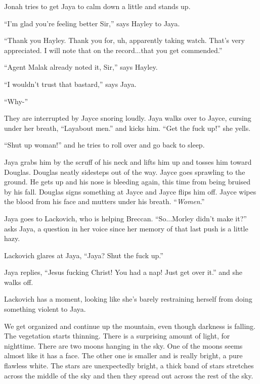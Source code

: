 Jonah tries to get Jaya to calm down a little and stands up.

``I'm glad you're feeling better Sir,'' says Hayley to Jaya.

``Thank you Hayley. Thank you for, uh, apparently taking watch.  That's very appreciated.  I will note that on the record...that you get commended.''

``Agent Malak already noted it, Sir,'' says Hayley.

``I wouldn't trust that bastard,'' says Jaya.

``Why-''

They are interrupted by Jayce snoring loudly.  Jaya walks over to Jayce, cursing under her breath, ``Layabout men.'' and kicks him.  ``Get the fuck up!'' she yells.

``Shut up woman!'' and he tries to roll over and go back to sleep.

Jaya grabs him by the scruff of his neck and lifts him up and tosses him toward Douglas.  Douglas neatly sidesteps out of the way.  Jayce goes sprawling to the ground.  He gets up and his nose is bleeding again, this time from being bruised by his fall.  Douglas signs something at Jayce and Jayce flips him off.  Jayce wipes the blood from his face and mutters under his breath.  ``\textit{Women}.''



Jaya goes to Lackovich, who is helping Breccan.  ``So...Morley didn't make it?'' asks Jaya, a question in her voice since her memory of that last push is a little hazy.

Lackovich glares at Jaya, ``Jaya?  Shut the fuck up.''

Jaya replies, ``Jesus fucking Christ!  You had a nap!  Just get over it.'' and she walks off.

Lackovich has a moment, looking like she's barely restraining herself from doing something violent to Jaya.  





We get organized and continue up the mountain, even though darkness is falling.  The vegetation starts thinning.  There is a surprising amount of light, for nighttime.  There are two moons hanging in the sky.  One of the moons seems almost like it has a face.  The other one is smaller and is really bright, a pure flawless white.   The stars are unexpectedly bright, a thick band of stars stretches across the middle of the sky and then they spread out across the rest of the sky.



